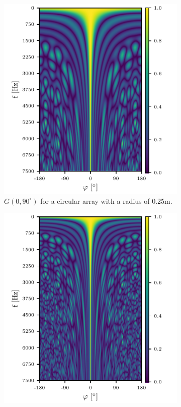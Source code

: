 \begin{figure}[h]
	\centering
	\begin{subfigure}[t]{0.45\textwidth}
		\centering
		\includegraphics[width=\textwidth]{circ_f_sweep_0.pdf}
		\caption{$G(0, 90^\circ)$ for a circular array with a radius of 0.25m.}
		\label{ssl:fig:f_dep0}
	\end{subfigure}
	\hfill
	\begin{subfigure}[t]{0.45\textwidth}
		\centering
		\includegraphics[width=\textwidth]{circ_f_sweep_1.pdf}

\end{subfigure}
\end{figure}
